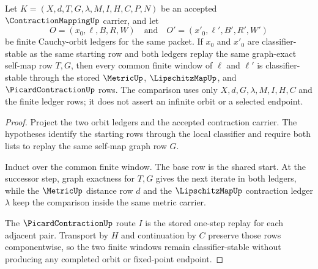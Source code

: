 \begin{theorem}
\label{thm:contraction-mapping-orbit-uniqueness-window}
Let $K=(X,d,T,G,\lambda,M,I,H,C,P,N)$ be an accepted $\ContractionMappingUp$ carrier, and let
$$
O=(x_0,\ell,B,R,W)
\quad\text{and}\quad
O'=(x'_0,\ell',B',R',W')
$$
be finite Cauchy-orbit ledgers for the same packet. If $x_0$ and $x'_0$ are classifier-stable as the same starting row and both ledgers replay the same graph-exact self-map row $T,G$, then every common finite window of $\ell$ and $\ell'$ is classifier-stable through the stored $\MetricUp$, $\LipschitzMapUp$, and $\PicardContractionUp$ rows. The comparison uses only $X,d,G,\lambda,M,I,H,C$ and the finite ledger rows; it does not assert an infinite orbit or a selected endpoint.
\end{theorem}
\begin{proof}
Project the two orbit ledgers and the accepted contraction carrier. The hypotheses identify the starting rows through the local classifier and require both lists to replay the same self-map graph row $G$.

Induct over the common finite window. The base row is the shared start. At the successor step, graph exactness for $T,G$ gives the next iterate in both ledgers, while the $\MetricUp$ distance row $d$ and the $\LipschitzMapUp$ contraction ledger $\lambda$ keep the comparison inside the same metric carrier.

The $\PicardContractionUp$ route $I$ is the stored one-step replay for each adjacent pair. Transport by $H$ and continuation by $C$ preserve those rows componentwise, so the two finite windows remain classifier-stable without producing any completed orbit or fixed-point endpoint.
\end{proof}

